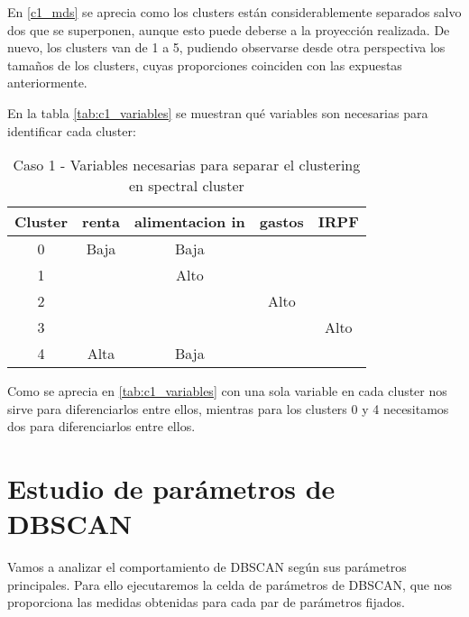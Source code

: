 En \eqref{c1_mds} se aprecia como los clusters están considerablemente separados salvo dos que se superponen, aunque esto puede deberse a la proyección realizada. De nuevo, los clusters van de 1 a 5, pudiendo observarse desde otra perspectiva los tamaños de los clusters, cuyas proporciones coinciden con las expuestas anteriormente.


En la tabla  \eqref{tab:c1_variables} se muestran qué variables son necesarias para identificar cada cluster:

\begin{table}[ht]
\centering
\caption{Caso 1 - Variables necesarias para separar el clustering en spectral cluster}
\label{tab:c1_variables}
\begin{tabular}{ccccc}
\toprule
 Cluster & renta & alimentacion in & gastos & IRPF \\
\midrule
0 & Baja & Baja & & \\
1 & & Alto & & \\
2 & & & Alto & \\
3 & & & & Alto \\
4 & Alta & Baja & & \\
\bottomrule
\end{tabular}
\end{table}
Como se aprecia en \eqref{tab:c1_variables} con una sola variable en cada cluster nos sirve para diferenciarlos entre ellos, mientras para los clusters 0 y 4 necesitamos dos para diferenciarlos entre ellos.

\section{Estudio de parámetros de DBSCAN}

Vamos a analizar el comportamiento de DBSCAN según sus parámetros principales. Para ello ejecutaremos la celda de parámetros de DBSCAN, que nos proporciona las medidas obtenidas para cada par de parámetros fijados.

